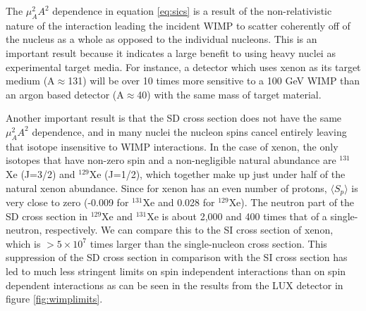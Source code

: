 The $\mu_A^2A^2$ dependence in equation \ref{eq:sics} is a result of the non-relativistic nature of the interaction leading the incident WIMP to scatter coherently off of the nucleus as a whole as opposed to the individual nucleons. This is an important result because it indicates a large benefit to using heavy nuclei as experimental target media. For instance, a detector which uses xenon as its target medium (A$\approx$131) will be over 10 times more sensitive to a 100 GeV WIMP than an argon based detector (A$\approx$40) with the same mass of target material. 

Another important result is that the SD cross section does not have the same $\mu_A^2A^2$ dependence, and in many nuclei the nucleon spins cancel entirely leaving that isotope insensitive to WIMP interactions. In the case of xenon, the only isotopes that have non-zero spin and a non-negligible natural abundance are $^{131}$Xe (J=3/2) and $^{129}$Xe (J=1/2), which together make up just under half of the natural xenon abundance. Since for xenon has an even number of protons, $\langle S_p \rangle$ is very close to zero (-0.009 for $^{131}$Xe and 0.028 for $^{129}$Xe). The neutron part of the SD cross section in $^{129}$Xe and $^{131}$Xe is about 2,000 and 400 times that of a single-neutron, respectively. We can compare this to the SI cross section of xenon, which is $>5\times 10^7$ times larger than the single-nucleon cross section. This suppression of the SD cross section in comparison with the SI cross section has led to much less stringent limits on spin independent interactions than on spin dependent interactions as can be seen in the results from the LUX detector in figure \ref{fig:wimplimits}.

